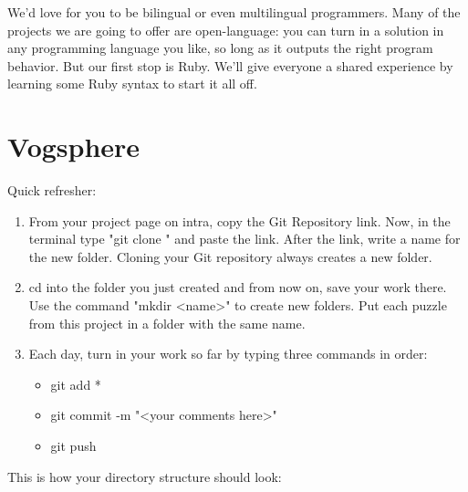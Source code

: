 \documentclass{42-en}
\begin{document}
We'd love for you to be bilingual or even multilingual programmers. Many of the projects we are going to offer are
open-language: you can turn in a solution in any programming language you like, so long as it outputs the right
program behavior. But our first stop is Ruby. We'll give everyone a shared experience by learning some Ruby syntax
to start it all off.\\



\chapter{Vogsphere}

Quick refresher:
\begin{enumerate}

	\item From your project page on intra, copy the Git Repository link. Now, in the terminal type "git clone " and paste the link. After the link, write a name for the new folder. Cloning your Git repository always creates a new folder.
	\item cd into the folder you just created and from now on, save your work there. Use the command "mkdir <name>" to create new folders. Put each puzzle from this project in a folder with the same name.
	\item Each day, turn in your work so far by typing three commands in order: 
	\begin{itemize}
		\item git add *
		\item git commit -m "<your comments here>"
		\item git push
	\end{itemize}

\end{enumerate}

This is how your directory structure should look:\\
\end{document}
